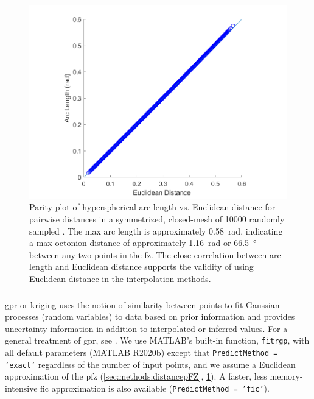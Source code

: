 \documentclass[preprint,12pt]{elsarticle}
\begin{document}
\begin{figure}
\centering
\includegraphics[width=0.5\linewidth]{dist-parity.png}
\caption{Parity plot of hyperspherical arc length vs. Euclidean distance for pairwise distances in a symmetrized, closed-mesh of \num{10000} randomly sampled . The max arc length is approximately \SI{0.58}{\radian}, indicating a max octonion distance of approximately \SI{1.16}{\radian} or \SI{66.5}{\degree} between any two points in the \acrlong{fz}. The close correlation between arc length and Euclidean distance supports the validity of using Euclidean distance in the interpolation methods.}
\label{fig:dist-parity}
\end{figure}

\subsubsection{}
\label{sec:methods:interp:gpr}


\Gls{gpr} or kriging uses the notion of similarity between points to fit Gaussian processes (random variables) to data based on prior information and provides uncertainty information in addition to interpolated or inferred values. For a general treatment of \gls{gpr}, see \cite{rasmussenGaussianProcessesMachine2006}. We use MATLAB's built-in function, \texttt{fitrgp}, with all default parameters (MATLAB R2020b) except that \texttt{PredictMethod = 'exact'} regardless of the number of input points, and we assume a Euclidean approximation of the \gls{pfz} (\cref{sec:methods:distancepFZ}, \cref{fig:dist-parity}). A faster, less memory-intensive \gls{fic} approximation is also available (\texttt{PredictMethod = 'fic'}).
\end{document}
